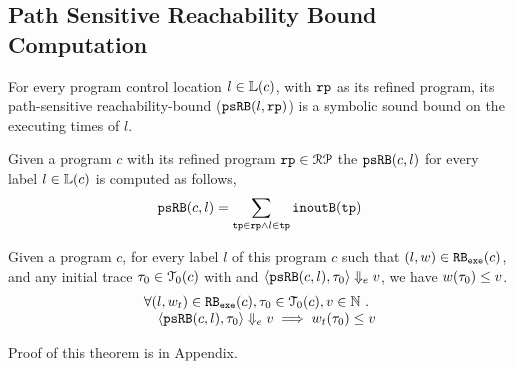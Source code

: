 \subsection{Path Sensitive Reachability Bound Computation}

For every program control location $l \in \mathbb{L}(c)$, with ${\mathtt{rp}}$ as its refined program,
its path-sensitive reachability-bound (${\mathtt{psRB}}(l, {\mathtt{rp}})$) is a symbolic sound bound on the executing times of $l$.

 \begin{defn}
  \label{def:label_psrb}
Given a program $c$ with its refined program ${\mathtt{rp}} \in \mathcal{RP}$
the ${\mathtt{psRB}}(c, l)$ for every label $l \in \mathbb{L}(c)$ is computed as follows,
\\
\[ {\mathtt{psRB}}(c, l) = \sum\limits_{{\mathtt{tp}} \in {\mathtt{rp}} \land 
l \in {\mathtt{tp}}} {\mathtt{inoutB}}({\mathtt{tp}})\]
 \end{defn}
\begin{thm}
  \label{thm:pathsensitive_rb_soundness}
Given a program ${c}$, for every label $l$ of this program $c$ such that $(l, w) \in {\mathtt{RB_{exe}}}(c)$, 
and any initial trace ${\mathtt{\tau}}_0 \in \mathcal{T}_0(c)$ with 
and $\langle {\mathtt{psRB}}(c, l), {\mathtt{\tau}}_0 \rangle \Downarrow_e v$,
we have $ w({\mathtt{\tau}}_0) \leq v $.
%
\[
  \begin{array}{l}
  \forall (l, w_{t}) \in {\mathtt{RB_{exe}}}(c),
  {\mathtt{\tau}}_0 \in \mathcal{T}_0(c), 
  v \in \mathbb{N} ~.~
  \\ \quad
  \langle {\mathtt{psRB}}(c, l), {\mathtt{\tau}}_0 \rangle \Downarrow_e v
  \implies
  w_{t}({\mathtt{\tau}}_0) \leq v
  \end{array}
  \]
\end{thm}
%
Proof of this theorem is in Appendix.